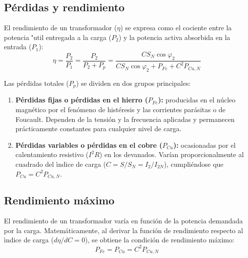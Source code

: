 \documentclass[12pt]{article}
\begin{document}
\subsection{P\'erdidas y rendimiento}
El rendimiento de un transformador ($\eta$) se expresa como el cociente entre la potencia \''util entregada a la carga ($P_2$) y la potencia activa absorbida en la entrada ($P_1$):
\begin{equation}
    \eta = \frac{P_2}{P_1}
    = \frac{P_2}{P_2 + P_p}
    = \frac{C S_N \cos\varphi_2}{C S_N \cos\varphi_2 + P_{Fe} + C^2 P_{Cu,N}}
\end{equation}

Las p\'erdidas totales ($P_p$) se dividen en dos grupos principales:
\begin{enumerate}
    \item \textbf{P\'erdidas fijas o p\'erdidas en el hierro ($P_{Fe}$):} producidas en el n\'ucleo magn\'etico por el fen\'omeno de hist\'eresis y las corrientes par\'asitas o de Foucault. Dependen de la tensi\'on y la frecuencia aplicadas y permanecen pr\'acticamente constantes para cualquier nivel de carga.
    \item \textbf{P\'erdidas variables o p\'erdidas en el cobre ($P_{Cu}$):} ocasionadas por el calentamiento resistivo ($I^2R$) en los devanados. Var\'ian proporcionalmente al cuadrado del \`indice de carga ($C = S/S_N = I_2/I_{2N}$), cumpli\'endose que $P_{Cu} = C^2 P_{Cu,N}$.
\end{enumerate}

\subsection{Rendimiento m\'aximo}
El rendimiento de un transformador var\'ia en funci\'on de la potencia demandada por la carga. Matem\'aticamente, al derivar la funci\'on de rendimiento respecto al \`indice de carga ($d\eta/dC = 0$), se obtiene la condici\'on de rendimiento m\'aximo:
\begin{equation}
    P_{Fe} = P_{Cu} = C^2 P_{Cu,N}
\end{equation}
\end{document}
